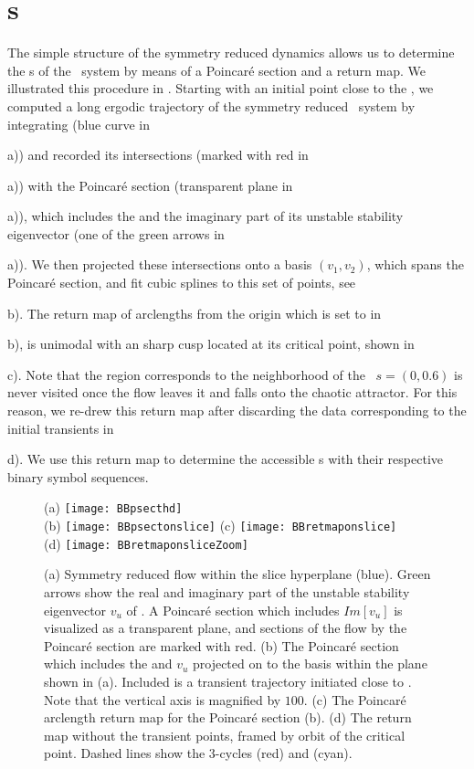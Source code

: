 \section{\Po s}
\label{s:numerics}

The simple structure of the symmetry reduced dynamics allows us to
determine the \rpo s of the \twomode\ system by means of a Poincar\'e
section and a return map. We illustrated this procedure in
. Starting with an initial point close to the
\REQV{}{}, we computed a long ergodic trajectory of the symmetry reduced
\twomode\ system by integrating  (blue curve in
\,{a)) and recorded its intersections (marked
with red in \,{a)) with the Poincar\'e section
(transparent plane in \,{a)), which includes
the \REQV{}{} and the imaginary part of its unstable stability
eigenvector (one of the green arrows in \,{a)).
We then projected these intersections onto a basis $(v_1, v_2)$, which
spans the Poincar\'e section, and fit cubic splines to this set of
points, see \,{b). The return map of arclengths
from the origin which is set to \REQV{}{} in
\,{b), is unimodal with an sharp cusp located at its critical point, shown
in \,{c). Note that the region corresponds to
the neighborhood of the \reqv\ $s = (0, 0.6)$ is never visited once the
flow leaves it and falls onto the chaotic attractor. For this reason, we
re-drew this return map after discarding the data corresponding to the
initial transients in \,{d). We use this return
map to determine the accessible \rpo s  with their respective binary
symbol sequences.

\begin{figure}
\centering
  (a) \texttt{[image: BBpsecthd]} \\
  (b) \texttt{[image: BBpsectonslice]}
  (c) \texttt{[image: BBretmaponslice]} \\
  (d) \texttt{[image: BBretmaponsliceZoom]}
\caption{(a) Symmetry reduced flow within the slice hyperplane (blue).
			Green arrows show the real and imaginary part of the unstable stability
			eigenvector $v_u$ of \REQV{}{}. A Poincar\'e section which includes
			$Im[v_u]$ is visualized as a transparent plane, and sections
			of the flow by the Poincar\'e section are marked with red.
		 (b) The Poincar\'e section which includes the \REQV{}{} and $v_u$ projected
			on to the basis within the plane shown in (a). Included is a
            transient trajectory initiated close to \REQV{}{}. Note that
		  	the vertical axis is magnified by $100$.
		 (c) The Poincar\'e arclength return map for the
		    Poincar\'e section (b).
		 (d) The return map without the transient points, framed by
            orbit of the critical point.
		 	Dashed lines show the 3-cycles  (red) and  (cyan).}
\label{fig:psectandretmap}
\end{figure}

}}}}}}}}

